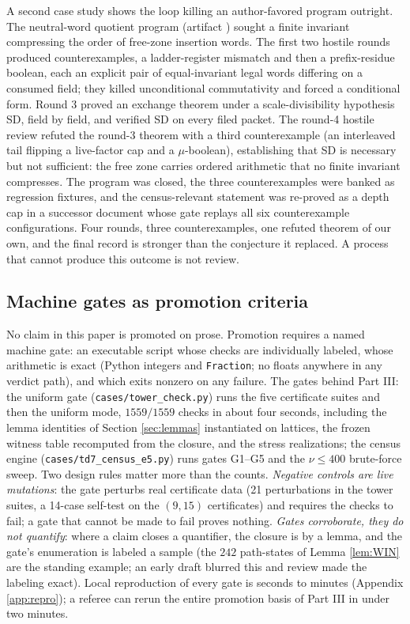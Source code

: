 \documentclass[11pt]{article}
\theoremstyle{definition}
\theoremstyle{remark}
\begin{document}
A second case study shows the loop killing an author-favored program outright. The neutral-word quotient program (artifact ) sought a finite invariant compressing the order of free-zone insertion words. The first two hostile rounds produced counterexamples, a ladder-register mismatch and then a prefix-residue boolean, each an explicit pair of equal-invariant legal words differing on a consumed field; they killed unconditional commutativity and forced a conditional form. Round 3 proved an exchange theorem under a scale-divisibility hypothesis SD, field by field, and verified SD on every filed packet. The round-4 hostile review refuted the round-3 theorem with a third counterexample (an interleaved tail flipping a live-factor cap and a $\mu$-boolean), establishing that SD is necessary but not sufficient: the free zone carries ordered arithmetic that no finite invariant compresses. The program was closed, the three counterexamples were banked as regression fixtures, and the census-relevant statement was re-proved as a depth cap in a successor document whose gate replays all six counterexample configurations. Four rounds, three counterexamples, one refuted theorem of our own, and the final record is stronger than the conjecture it replaced. A process that cannot produce this outcome is not review.

\subsection{Machine gates as promotion criteria}\label{sec:gates}

No claim in this paper is promoted on prose. Promotion requires a named machine gate: an executable script whose checks are individually labeled, whose arithmetic is exact (Python integers and \texttt{Fraction}; no floats anywhere in any verdict path), and which exits nonzero on any failure. The gates behind Part III: the uniform gate (\texttt{cases/tower\_check.py}) runs the five certificate suites and then the uniform mode, $1559/1559$ checks in about four seconds, including the lemma identities of Section \ref{sec:lemmas} instantiated on lattices, the frozen witness table recomputed from the closure, and the stress realizations; the census engine (\texttt{cases/td7\_census\_e5.py}) runs gates G1--G5 and the $\nu\leq400$ brute-force sweep. Two design rules matter more than the counts. \emph{Negative controls are live mutations}: the gate perturbs real certificate data (21 perturbations in the tower suites, a 14-case self-test on the $(9,15)$ certificates) and requires the checks to fail; a gate that cannot be made to fail proves nothing. \emph{Gates corroborate, they do not quantify}: where a claim closes a quantifier, the closure is by a lemma, and the gate's enumeration is labeled a sample (the $242$ path-states of Lemma \ref{lem:WIN} are the standing example; an early draft blurred this and review made the labeling exact). Local reproduction of every gate is seconds to minutes (Appendix \ref{app:repro}); a referee can rerun the entire promotion basis of Part III in under two minutes.
\end{document}
